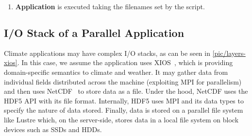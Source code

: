 \documentclass{superfri}
\begin{document}
\begin{enumerate}
  \item \textbf{Application} is executed taking the filenames set by the script.

\end{enumerate}

\subsection{I/O Stack of a Parallel Application}

Climate applications may have complex I/O stacks, as can be seen in \cref{pic/layers-xios}.
In this case, we assume the application uses XIOS~\cite{xios}, which is providing domain-specific semantics to climate and weather.
It may gather data from individual fields distributed across the machine (exploiting MPI for parallelism) and then uses NetCDF~\cite{netcdf} to store data as a file.
Under the hood, NetCDF uses the HDF5 API with its file format.
Internally, HDF5 uses MPI and its data types to specify the nature of data stored.
Finally, data is stored on a parallel file system like Lustre which, on the server-side, stores data in a local file system on block devices such as SSDs and HDDs.
\end{document}
